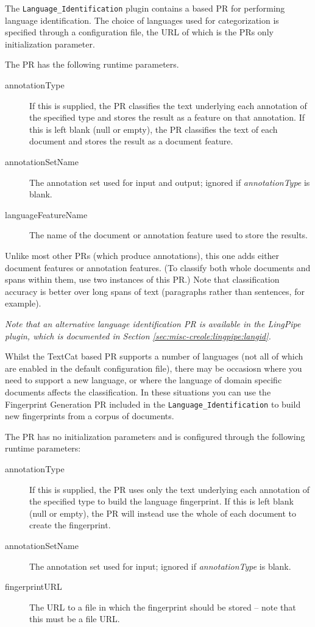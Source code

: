 The \texttt{Language\_Identification} plugin contains a
 based PR for
performing language identification. The choice of languages used for
categorization is specified through a configuration file, the URL of which
is the PRs only initialization parameter.


The PR has the following runtime parameters.
\begin{description}
\item[annotationType] If this is supplied, the PR classifies the text underlying
  each annotation of the specified type and stores the result as a feature on
  that annotation.  If this is left blank (null or empty), the PR classifies the
  text of each document and stores the result as a document feature.
\item[annotationSetName] The annotation set used for input and output; ignored
  if \emph{annotationType} is blank.
\item[languageFeatureName] The name of the document or annotation feature used
  to store the results.
\end{description}

Unlike most other PRs (which produce annotations), this one adds either document
features or annotation features.  (To classify both whole documents and spans
within them, use two instances of this PR.)  Note that classification accuracy
is better over long spans of text (paragraphs rather than sentences, for
example).

\textit{Note that an alternative language identification PR is available in the LingPipe plugin,
which is documented in Section \ref{sec:misc-creole:lingpipe:langid}.}

Whilst the TextCat based PR supports a number of languages (not all of which are enabled in the default
configuration file), there may be occasiosn where you need to support a new language, or where the
language of domain specific documents affects the classification. In these situations you can use the
Fingerprint Generation PR included in the \texttt{Language\_Identification} to build new fingerprints
from a corpus of documents.

The PR has no initialization parameters and is configured through the following runtime parameters:
\begin{description}
\item[annotationType] If this is supplied, the PR uses only the text underlying
  each annotation of the specified type to build the language fingerprint.
  If this is left blank (null or empty), the PR will instead use the whole of
  each document to create the fingerprint.
\item[annotationSetName] The annotation set used for input; ignored
  if \emph{annotationType} is blank.
\item[fingerprintURL] The URL to a file in which the fingerprint should be
  stored -- note that this must be a file URL.
\end{description}

